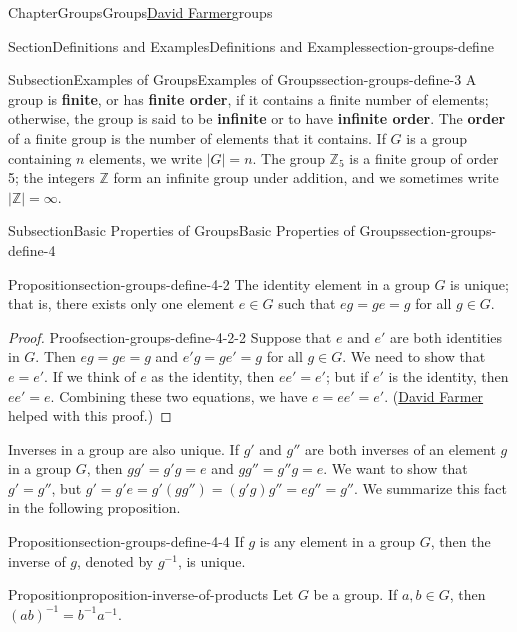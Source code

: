 \documentclass[oneside,10pt,]{book}
\newcommand{\terminology}[1]{\textbf{#1}}
\numberwithin{equation}{section}
\begin{document}
\begin{chapterptx}{Chapter}{Groups}{}{Groups}{\hyperlink{dfarmer}{David Farmer}}{}{groups}
\begin{sectionptx}{Section}{Definitions and Examples}{}{Definitions and Examples}{}{}{section-groups-define}
\begin{subsectionptx}{Subsection}{Examples of Groups}{}{Examples of Groups}{}{}{section-groups-define-3}
A group is \terminology{finite}, or has \terminology{finite order}, if it contains a finite number of elements; otherwise, the group is said to be \terminology{infinite} or to have \terminology{infinite order}. The \terminology{order} of a finite group is the number of elements that it contains. If \(G\) is a group containing \(n\) elements, we write \(|G| = n\). \label{section-groups-define-3-11-12} The group \({\mathbb Z}_5\) is a finite group of order 5; the integers \({\mathbb Z}\) form an infinite group under addition, and we sometimes write \(|{\mathbb Z}| = \infty\).%
\end{subsectionptx}
%
%
\typeout{************************************************}
\typeout{************************************************}
%
\begin{subsectionptx}{Subsection}{Basic Properties of Groups}{}{Basic Properties of Groups}{}{}{section-groups-define-4}
\begin{proposition}{Proposition}{}{}{section-groups-define-4-2}%
The identity element in a group \(G\) is unique; that is, there exists only one element \(e \in G\) such that \(eg = ge = g\) for all \(g \in G\).%
\end{proposition}
\begin{proof}{Proof}{}{section-groups-define-4-2-2}
Suppose that \(e\) and \(e'\) are both identities in \(G\). Then \(eg = ge = g\) and \(e'g = ge' = g\) for all \(g \in G\). We need to show that \(e = e'\). If we think of \(e\) as the identity, then \(ee' = e'\); but if \(e'\) is the identity, then \(ee' = e\). Combining these two equations, we have \(e = ee' = e'\). (\hyperlink{dfarmer}{David Farmer} helped with this proof.)%
\end{proof}
Inverses in a group are also unique. If \(g'\) and \(g''\) are both inverses of an element \(g\) in a group \(G\), then \(gg' = g'g = e\) and \(gg'' = g''g = e\). We want to show that \(g' = g''\), but \(g' = g'e = g'(gg'') = (g'g)g'' = eg'' = g''\). We summarize this fact in the following proposition.%
\begin{proposition}{Proposition}{}{}{section-groups-define-4-4}%
If \(g\) is any element in a group \(G\), then the inverse of \(g\), denoted by \(g^{-1}\), is unique.%
\end{proposition}
\begin{proposition}{Proposition}{}{}{proposition-inverse-of-products}%
Let \(G\) be a group. If \(a, b \in G\), then \((ab)^{-1} = b^{-1}a^{-1}\).%

\end{proposition}
\end{subsectionptx}
\end{sectionptx}
\end{chapterptx}
\end{document}
